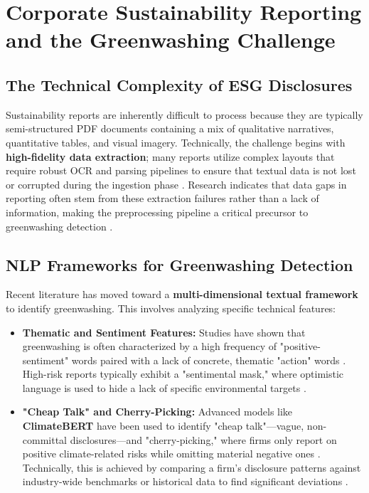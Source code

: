 \section{ Corporate Sustainability Reporting and the Greenwashing Challenge}
\subsection{ The Technical Complexity of ESG Disclosures}

Sustainability reports are inherently difficult to process because they are typically semi-structured PDF documents containing a mix of qualitative narratives, quantitative tables, and visual imagery. Technically, the challenge begins with \textbf{high-fidelity data extraction}; many reports utilize complex layouts that require robust OCR and parsing pipelines to ensure that textual data is not lost or corrupted during the ingestion phase  \parencite[]{marco_bronzini_bf94d949, jacob_beck_9548a833}. Research indicates that data gaps in reporting often stem from these extraction failures rather than a lack of information, making the preprocessing pipeline a critical precursor to greenwashing detection  \parencite{jacob_beck_9548a833}.
\subsection{ NLP Frameworks for Greenwashing Detection}

Recent literature has moved toward a \textbf{multi-dimensional textual framework} to identify greenwashing. This involves analyzing specific technical features:
\begin{itemize}
\item 

\textbf{Thematic and Sentiment Features:} Studies have shown that greenwashing is often characterized by a high frequency of "positive-sentiment" words paired with a lack of concrete, thematic "action" words  \parencite{xiaojia_wang_02351a60}. High-risk reports typically exhibit a "sentimental mask," where optimistic language is used to hide a lack of specific environmental targets  \parencite{xiaojia_wang_02351a60}.\item 

\textbf{"Cheap Talk" and Cherry-Picking:} Advanced models like \textbf{ClimateBERT} have been used to identify "cheap talk"—vague, non-committal disclosures—and "cherry-picking," where firms only report on positive climate-related risks while omitting material negative ones  \parencite{julia_bingler_268445e3}. Technically, this is achieved by comparing a firm's disclosure patterns against industry-wide benchmarks or historical data to find significant deviations  \parencite{julia_bingler_268445e3}.
\end{itemize}
